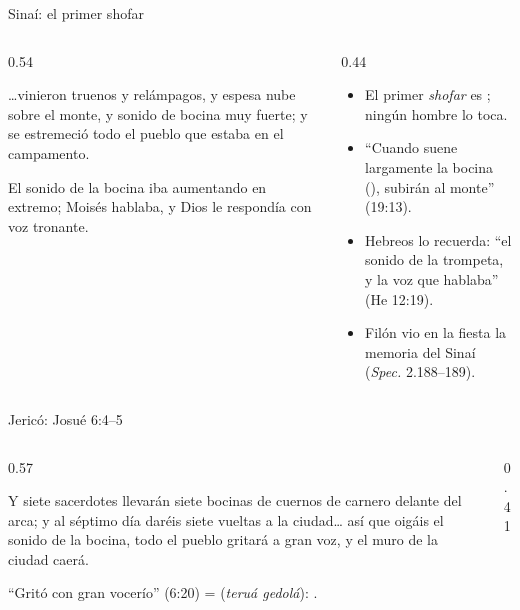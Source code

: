 \begin{frame}{Sinaí: el primer shofar}
\begin{columns}[t,onlytextwidth]
\begin{column}{0.54\textwidth}
\begin{cita}\ldots{}vinieron truenos y relámpagos, y espesa nube sobre el monte, y sonido de bocina muy fuerte; y se estremeció todo el pueblo que estaba en el campamento.\end{cita}
\begin{cita}El sonido de la bocina iba aumentando en extremo; Moisés hablaba, y Dios le respondía con voz tronante.\end{cita}
\end{column}
\begin{column}{0.44\textwidth}\small\RaggedRight
\begin{itemize}
\item El primer \emph{shofar} es ; ningún hombre lo toca.
\item ``Cuando suene largamente la bocina (), subirán al monte'' (19:13).
\item Hebreos lo recuerda: ``el sonido de la trompeta, y la voz que hablaba'' (He 12:19).
\item Filón vio en la fiesta la memoria del Sinaí (\emph{Spec.} 2.188--189).
\end{itemize}
\end{column}
\end{columns}
\end{frame}

\begin{frame}{Jericó: Josué 6:4--5}
\begin{columns}[c,onlytextwidth]
\begin{column}{0.57\textwidth}
\begin{cita}Y siete sacerdotes llevarán siete bocinas de cuernos de carnero delante del arca; y al séptimo día daréis siete vueltas a la ciudad\ldots{} así que oigáis el sonido de la bocina, todo el pueblo gritará a gran voz, y el muro de la ciudad caerá.\end{cita}
\small\RaggedRight ``Gritó con gran vocerío'' (6:20) =  (\emph{teruá gedolá}): .
\end{column}
\begin{column}{0.41\textwidth}\end{column}
\end{columns}
\end{frame}

